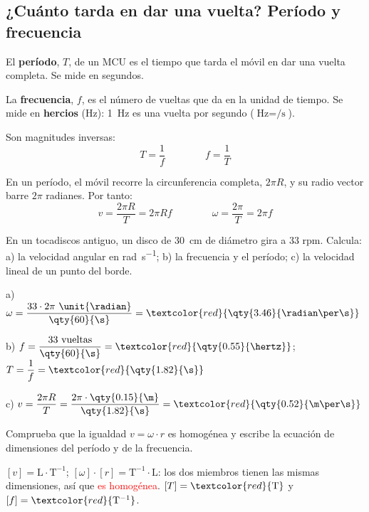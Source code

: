 \subsection{¿Cuánto tarda en dar una vuelta? Período y frecuencia}

\begin{definition}
    El \textbf{período}, \(T\), de un MCU es el tiempo que tarda el móvil en dar una vuelta completa. Se mide en segundos.

    La \textbf{frecuencia}, \(f\), es el número de vueltas que da en la unidad de tiempo. Se mide en \textbf{hercios} (\unit{\hertz}): \qty{1}{\hertz} es una vuelta por segundo (\(\unit{\hertz} = \unit{\per\s}\)).

    Son magnitudes inversas:
    \[ T = \frac{1}{f} \qquad\qquad f = \frac{1}{T} \]
\end{definition}

En un período, el móvil recorre la circunferencia completa, \(2\pi R\), y su radio vector barre \(2\pi\) radianes. Por tanto:
\[ v = \frac{2\pi R}{T} = 2\pi R f \qquad\qquad \omega = \frac{2\pi}{T} = 2\pi f \]

\begin{example}
    En un tocadiscos antiguo, un disco de \qty{30}{\cm} de diámetro gira a 33 rpm. Calcula: a) la velocidad angular en \unit{\radian\per\s}; b) la frecuencia y el período; c) la velocidad lineal de un punto del borde.

    a) \(\omega = \dfrac{33 \cdot 2\pi~\unit{\radian}}{\qty{60}{\s}} = \textcolor{red}{\qty{3.46}{\radian\per\s}}\)

    b) \(f = \dfrac{33~\text{vueltas}}{\qty{60}{\s}} = \textcolor{red}{\qty{0.55}{\hertz}}\); \(T = \dfrac{1}{f} = \textcolor{red}{\qty{1.82}{\s}}\)

    c) \(v = \dfrac{2\pi R}{T} = \dfrac{2\pi \cdot \qty{0.15}{\m}}{\qty{1.82}{\s}} = \textcolor{red}{\qty{0.52}{\m\per\s}}\)
\end{example}

\begin{exercise}
    Comprueba que la igualdad \(v = \omega \cdot r\) es homogénea y escribe la ecuación de dimensiones del período y de la frecuencia.
    \begin{solu}
        \([v] = \mathrm{L} \cdot \mathrm{T}^{-1}\); \([\omega] \cdot [r] = \mathrm{T}^{-1} \cdot \mathrm{L}\): los dos miembros tienen las mismas dimensiones, así que \textcolor{red}{es homogénea}. \([T] = \textcolor{red}{\mathrm{T}}\) y \([f] = \textcolor{red}{\mathrm{T}^{-1}}\).
    \end{solu}
\end{exercise}

